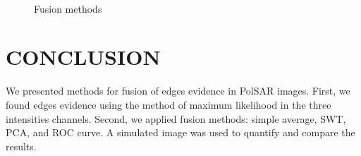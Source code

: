 \documentclass[a4paper,12pt]{article}
\begin{document}
\begin{figure}[hbt]
	\centering
     \\
     \caption{Fusion methods}
     \label{fusion_met}
\end{figure}

\section{CONCLUSION}

We presented methods for fusion of edges evidence in PolSAR images. 
First, we found edges evidence using the method of maximum likelihood in the three intensities channels. 
Second, we applied fusion methods: simple average, SWT, PCA, and ROC curve. 
A simulated image was used to quantify and compare the results. 
\end{document}
